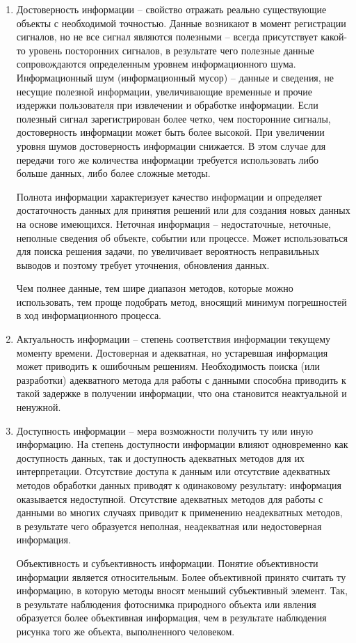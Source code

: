 \documentclass[a4paper]{article}
\begin{document}
\begin{enumerate}
\item Достоверность информации – свойство отражать реально существующие объекты с необходимой точностью. Данные возникают в момент регистрации сигналов, но не все сигнал являются полезными – всегда присутствует какой-то уровень посторонних сигналов, в результате чего полезные данные сопровождаются определенным уровнем информационного шума. Информационный шум (информационный мусор) – данные и сведения, не несущие полезной информации, увеличивающие временные и прочие издержки пользователя при извлечении  и обработке информации. Если полезный сигнал зарегистрирован более четко, чем посторонние сигналы, достоверность информации может быть более высокой. При увеличении уровня шумов достоверность информации снижается. В этом случае для передачи того же количества информации требуется использовать либо больше данных, либо более сложные методы.

Полнота информации характеризует качество информации и определяет достаточность данных для принятия решений или для создания новых данных на основе имеющихся. Неточная информация – недостаточные, неточные, неполные сведения об объекте, событии или процессе. Может использоваться для поиска решения задачи, по увеличивает вероятность неправильных выводов и поэтому требует уточнения, обновления данных.

Чем полнее данные, тем шире диапазон методов, которые можно использовать, тем проще подобрать метод, вносящий минимум погрешностей в ход информационного процесса.

\item Актуальность информации – степень соответствия информации текущему моменту времени. Достоверная и адекватная, но устаревшая информация может приводить к ошибочным решениям. Необходимость поиска (или разработки) адекватного метода для работы с данными способна приводить к такой задержке в получении информации, что она становится неактуальной и ненужной.

\item Доступность информации – мера возможности получить ту или иную информацию. На степень доступности информации влияют одновременно как доступность данных, так и доступность адекватных методов для их интерпретации. Отсутствие доступа к данным или отсутствие адекватных методов обработки данных приводят к одинаковому результату: информация оказывается недоступной. Отсутствие адекватных методов для работы с данными во многих случаях приводит к применению неадекватных методов, в результате чего образуется неполная, неадекватная или недостоверная информация.

Объективность и субъективность информации. Понятие объективности информации является относительным. Более объективной принято считать ту информацию, в которую методы вносят меньший субъективный элемент. Так, в результате наблюдения фотоснимка природного объекта или явления образуется более объективная информация, чем в результате наблюдения рисунка того же объекта, выполненного человеком.

\end{enumerate}
\end{document}
